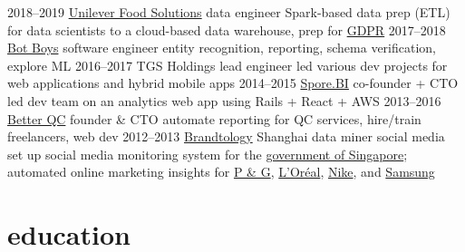 \documentclass[]{friggeri-cv}
\begin{document}
\begin{entrylist}
\entry
    {2018–2019}
    {\href{https://www.unileverfoodsolutions.com/}{Unilever Food Solutions}}
    {data engineer}
    {
      Spark-based data prep (ETL) for data scientists to a cloud-based data warehouse, prep for \href{https://www.eugdpr.org/{GDPR}}
      {GDPR}
    }
\entry
    {2017–2018}
    {\href{https://www.botboys.com/en/welcome/}{Bot Boys}}
    {software engineer}
    {entity recognition, reporting, schema verification, explore ML}
\entry
    {2016–2017}
    {TGS Holdings}
    {lead engineer}
    {led various dev projects for web applications and hybrid mobile apps}
\entry
    {2014–2015}
    {\href{http://sporebi.com/}{Spore.BI}}
    {co-founder + CTO}
    {led dev team on an analytics web app using Rails + React + AWS}
\entry
    {2013–2016}
    {\href{http://betterqc.com/}{Better QC}}
    {founder \& CTO}
    {automate reporting for QC services, hire/train freelancers, web dev}
\entry
    {2012–2013}
    {\href{http://www.isentia.com.sg/services/brandtology-social-media}{Brandtology} Shanghai}
    {data miner social media}
    {
      set up social media monitoring system for the \href{https://www.gov.sg/}{government of Singapore}; automated online marketing insights for
      \href{https://www.pg.com/}{P \& G},
      \href{http://www.loreal.com/}{L'Oréal},
      \href{https://www.nike.com/}{Nike},
      and
      \href{http://samsung.com/}{Samsung}
    }
\end{entrylist}

\section{education}
\end{document}
